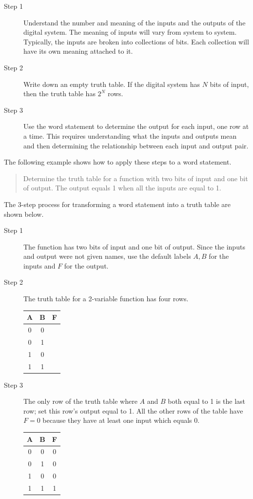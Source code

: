 \begin{description}
\item [Step 1] Understand the number and meaning of the
inputs and the outputs of the digital system.  The meaning of inputs
will vary from system to system.  Typically, the inputs are broken into
collections of bits.  Each collection will have its own meaning attached
to it.

\item [Step 2] Write down an empty truth table.  If
the digital system has $N$ bits of input, then the truth table
has $2^N$ rows.  

\item [Step 3] Use the word statement to determine the output for 
each input, one row at a time.  This requires understanding what the inputs 
and outputs mean and then determining the relationship between each
input and output pair.
\end{description}

The following example shows how to apply these steps to a word statement.

\begin{quote}
Determine the truth table for 
a function with two bits of input and one bit of output.  The
output equals 1 when all the inputs are equal to 1.
\end{quote}

The 3-step process for transforming a word statement into a 
truth table are shown below.

\begin{description}
\item [Step 1] The function has two bits of input and one bit of output.  
Since the inputs and output were not given names, use the default labels
$A,B$ for the inputs and $F$ for the output.

\item [Step 2] The truth table for a 2-variable function has four 
rows.

	\begin{tabular}{c|c||c}
	A & B & F \\ \hline \hline
	0 & 0 &   \\ \hline
	0 & 1 &   \\ \hline
	1 & 0 &   \\ \hline
	1 & 1 &   \\
	\end{tabular}

\item [Step 3] The only row of the truth table where $A$ and $B$ both
equal to 1 is the last row; set this row's output equal to 1.  
All the other rows of the table have $F=0$ because they have
at least one input which equals 0.

	\begin{tabular}{c|c||c}
	A & B & F \\ \hline \hline
	0 & 0 & 0  \\ \hline
	0 & 1 & 0  \\ \hline
	1 & 0 & 0  \\ \hline
	1 & 1 & 1  \\
	\end{tabular}
\end{description}

